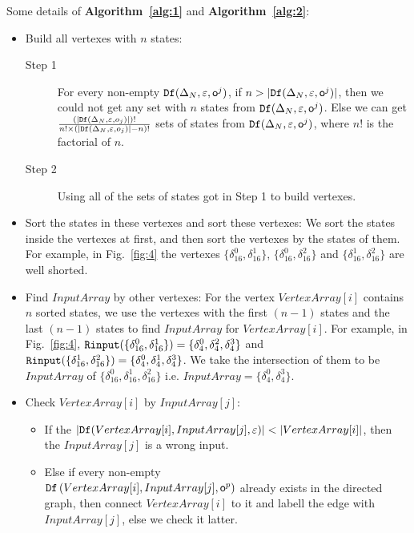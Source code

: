 Some details of {\bf Algorithm~\ref{alg:1}} and {\bf Algorithm~\ref{alg:2}}:
\begin{itemize}
\item Build all vertexes with $n$ states:
\begin{description}
\item[Step 1] For every non-empty ${\tt Df}(\Delta_N,\varepsilon,\mathsf{o}^{j})$, if $n>|{\tt Df}(\Delta_N,\varepsilon,\mathsf{o}^{j})|$, then we could not get any set with $n$ states from ${\tt Df}(\Delta_N,\varepsilon,\mathsf{o}^{j})$. Else we can get $\frac{(|{\tt Df}(\Delta_N,\varepsilon,o_j)|)!}{n!\times (|{\tt Df}(\Delta_N,\varepsilon,o_j)|-n)!}$ sets of states from ${\tt Df}(\Delta_N,\varepsilon,\mathsf{o}^{j})$, where $n!$ is the factorial of $n$.
\item[Step 2] Using all of the sets of states got in Step 1 to build vertexes. 
\end{description}
 \item Sort the states in these vertexes and sort these vertexes: We sort the states inside the vertexes at first, and then sort the vertexes by the states of them. For example, in Fig.~\ref{fig:4} the vertexes $\{\delta_{16}^0,\delta_{16}^1\}$, $\{\delta_{16}^0,\delta_{16}^2\}$ and $\{\delta_{16}^1,\delta_{16}^2\}$ are well shorted. 
  \item Find $InputArray$ by other vertexes:
   For the vertex $VertexArray[i]$ contains $n$ sorted states, we use the vertexes with the first $(n-1)$ states and the last $(n-1)$ states to find $InputArray$ for $VertexArray[i]$. For example, in Fig.~\ref{fig:4}, ${\tt Rinput}(\{\delta_{16}^0,\delta_{16}^1\})=\{\delta_{4}^0,\delta_{4}^2,\delta_{4}^3\}$ and ${\tt Rinput}(\{\delta_{16}^1,\delta_{16}^2\})=\{\delta_{4}^0,\delta_{4}^1,\delta_{4}^3\}$. We take the intersection of them to be $InputArray$ of $\{\delta_{16}^0,\delta_{16}^1,\delta_{16}^2\}$ i.e. $InputArray=\{\delta_{4}^0,\delta_{4}^3\}$. 
  \item Check $VertexArray[i]$ by $InputArray[j]$:
     
\begin{itemize}
\item If the $|\Ded(VertexArray[i],InputArray[j],\varepsilon)|<|VertexArray[i]|$, then the $InputArray[j]$ is a wrong input.
\item Else if every non-empty \\${\tt Df}\left(VertexArray[i],InputArray[j],\mathsf{o}^{p}\right)$ already exists in the directed graph, then connect $VertexArray[i]$ to it and labell the edge with $InputArray[j]$, else we check it latter. 
\end{itemize} 
\end{itemize} 


